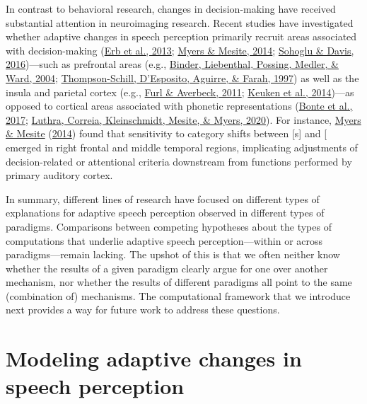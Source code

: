 \documentclass[
  11pt,
  english,
  man,floatsintext]{apa6}
\begin{document}
In contrast to behavioral research, changes in decision-making have received substantial attention in neuroimaging research. Recent studies have investigated whether adaptive changes in speech perception primarily recruit areas associated with decision-making (\protect\hyperlink{ref-erb2013brain}{Erb et al., 2013}; \protect\hyperlink{ref-myers-mesite2014}{Myers \& Mesite, 2014}; \protect\hyperlink{ref-sohoglu-davis2016}{Sohoglu \& Davis, 2016})---such as prefrontal areas (e.g., \protect\hyperlink{ref-binder2004neural}{Binder, Liebenthal, Possing, Medler, \& Ward, 2004}; \protect\hyperlink{ref-thompson1997role}{Thompson-Schill, D'Esposito, Aguirre, \& Farah, 1997}) as well as the insula and parietal cortex (e.g., \protect\hyperlink{ref-furl2011parietal}{Furl \& Averbeck, 2011}; \protect\hyperlink{ref-keuken2014}{Keuken et al., 2014})---as opposed to cortical areas associated with phonetic representations (\protect\hyperlink{ref-bonte2017}{Bonte et al., 2017}; \protect\hyperlink{ref-luthra2020a}{Luthra, Correia, Kleinschmidt, Mesite, \& Myers, 2020}). For instance, \protect\hyperlink{ref-myers-mesite2014}{Myers \& Mesite} (\protect\hyperlink{ref-myers-mesite2014}{2014}) found that sensitivity to category shifts between {[}s{]} and {[}\ipatext{ʃ}{]} emerged in right frontal and middle temporal regions, implicating adjustments of decision-related or attentional criteria downstream from functions performed by primary auditory cortex.

In summary, different lines of research have focused on different types of explanations for adaptive speech perception observed in different types of paradigms. Comparisons between competing hypotheses about the types of computations that underlie adaptive speech perception---within or across paradigms---remain lacking. The upshot of this is that we often neither know whether the results of a given paradigm clearly argue for one over another mechanism, nor whether the results of different paradigms all point to the same (combination of) mechanisms. The computational framework that we introduce next provides a way for future work to address these questions.

\hypertarget{sec:framework}{%
\section{Modeling adaptive changes in speech perception}\label{sec:framework}}
\end{document}
